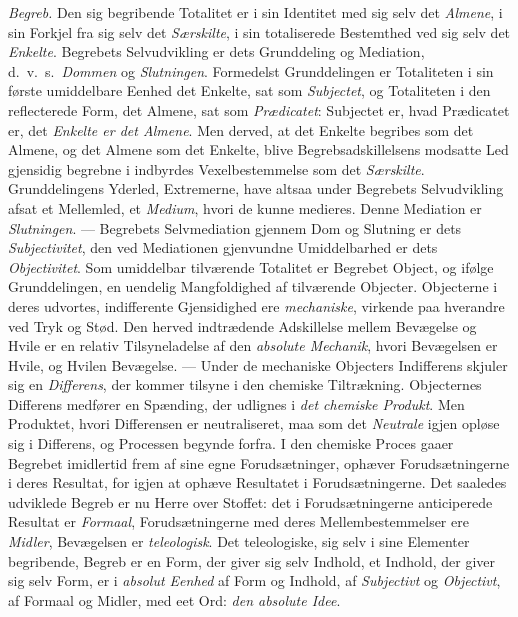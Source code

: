 \documentclass[12pt]{book}
\newcommand{\apage}[1]{\marginnote{\footnotesize\textit{[#1]}}}
\begin{document}
\emph{Begreb.} Den sig begribende Totalitet er i sin Identitet med sig selv
det \emph{Almene}, i sin Forkjel fra sig selv det \emph{Særskilte}, i sin totaliserede
Bestemthed ved sig selv det \emph{Enkelte}. Begrebets Selvudvikling er dets
Grunddeling og Mediation, d.\ v.\ s.\ \emph{Dommen} og \emph{Slutningen}. Formedelst
Grunddelingen er Totaliteten i sin første umiddelbare Eenhed det Enkelte,
sat som \emph{Subjectet}, og Totaliteten i den reflecterede Form, det Almene, sat
som \emph{Prædicatet}: Subjectet er, hvad Prædicatet er, det \emph{Enkelte er det
Almene}. Men derved, at det Enkelte begribes som det Almene, og det Almene
som det Enkelte, blive Begrebsadskillelsens modsatte Led gjensidig begrebne
i indbyrdes Vexelbestemmelse som det \emph{Særskilte}. Grunddelingens Yderled,
Extremerne, have altsaa under Begrebets Selvudvikling afsat et Mellemled,
et \emph{Medium}, hvori de kunne medieres. Denne Mediation er \emph{Slutningen}.
--- Begrebets Selvmediation gjennem Dom og Slutning er dets \emph{Subjectivitet}, den
ved Mediationen  \apage{104} gjenvundne Umiddelbarhed er dets \emph{Objectivitet}. Som
umiddelbar tilværende Totalitet er Begrebet Object, og ifølge
Grunddelingen, en uendelig Mangfoldighed af tilværende Objecter. Objecterne
i deres udvortes, indifferente Gjensidighed ere \emph{mechaniske}, virkende paa
hverandre ved Tryk og Stød. Den herved indtrædende Adskillelse mellem
Bevægelse og Hvile er en relativ Tilsyneladelse af den \emph{absolute Mechanik},
hvori Bevægelsen er Hvile, og Hvilen Bevægelse. --- Under de mechaniske
Objecters Indifferens skjuler sig en \emph{Differens}, der kommer tilsyne i den
chemiske Tiltrækning. Objecternes Differens medfører en Spænding, der
udlignes i \emph{det chemiske Produkt}. Men Produktet, hvori Differensen er
neutraliseret, maa som det \emph{Neutrale} igjen opløse sig i Differens, og
Processen begynde forfra. I den chemiske Proces gaaer Begrebet imidlertid
frem af sine egne Forudsætninger, ophæver Forudsætningerne i deres
Resultat, for igjen at ophæve Resultatet i Forudsætningerne. Det saaledes
udviklede Begreb er nu Herre over Stoffet: det i Forudsætningerne
anticiperede Resultat er \emph{Formaal}, Forudsætningerne med deres
Mellembestemmelser ere \emph{Midler}, Bevægelsen er \emph{teleologisk}. Det teleologiske,
sig selv i sine Elementer begribende, Begreb er en Form, der giver sig
selv Indhold, et Indhold, der giver sig selv Form, er i \emph{absolut Eenhed} af
Form og Indhold, af \emph{Subjectivt} og \emph{Objectivt}, af Formaal og Midler, med eet
Ord: \emph{den absolute Idee}.
\end{document}

